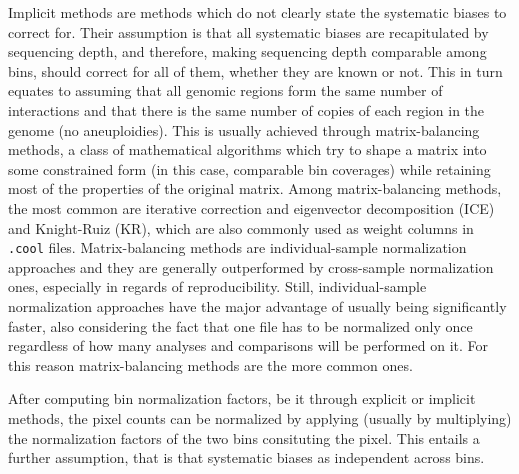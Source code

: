 Implicit methods are methods which do not clearly state the systematic biases to correct for. Their assumption is that all systematic biases are recapitulated by sequencing depth, and therefore, making sequencing depth comparable among bins, should correct for all of them, whether they are known or not. This in turn equates to assuming that all genomic regions form the same number of interactions and that there is the same number of copies of each region in the genome (no aneuploidies). This is usually achieved through matrix-balancing methods, a class of mathematical algorithms which try to shape a matrix into some constrained form (in this case, comparable bin coverages) while retaining most of the properties of the original matrix. Among matrix-balancing methods, the most common are iterative correction and eigenvector decomposition (ICE)\cite{ice2012} and Knight-Ruiz (KR)\cite{knightruiz2012}, which are also commonly used as weight columns in \texttt{.cool} files. Matrix-balancing methods are individual-sample normalization approaches and they are generally outperformed by cross-sample normalization ones, especially in regards of reproducibility. Still, individual-sample normalization approaches have the major advantage of usually being significantly faster, also considering the fact that one file has to be normalized only once regardless of how many analyses and comparisons will be performed on it. For this reason matrix-balancing methods are the more common ones.

After computing bin normalization factors, be it through explicit or implicit methods, the pixel counts can be normalized by applying (usually by multiplying) the normalization factors of the two bins consituting the pixel. This entails a further assumption, that is that systematic biases as independent across bins.



